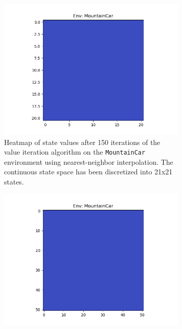 \documentclass{article}
\begin{document}
\begin{enumerate}[(a)]
\begin{figure}[h!]
    \centering
    \begin{subfigure}{0.3\textwidth}
        \centering
        \includegraphics[width=\textwidth]{../figures/MountainCar_nn_21.png}
        \caption{Heatmap of state values after 150 iterations of the value iteration algorithm on the \texttt{MountainCar} environment using nearest-neighbor interpolation. The continuous state space has been discretized into 21x21 states.}
    \end{subfigure}
    \hspace{0.1 in}
    \begin{subfigure}{0.3\textwidth}
        \centering
        \includegraphics[width=\textwidth]{../figures/MountainCar_nn_51.png}

\end{subfigure}
\end{figure}
\end{enumerate}
\end{document}
